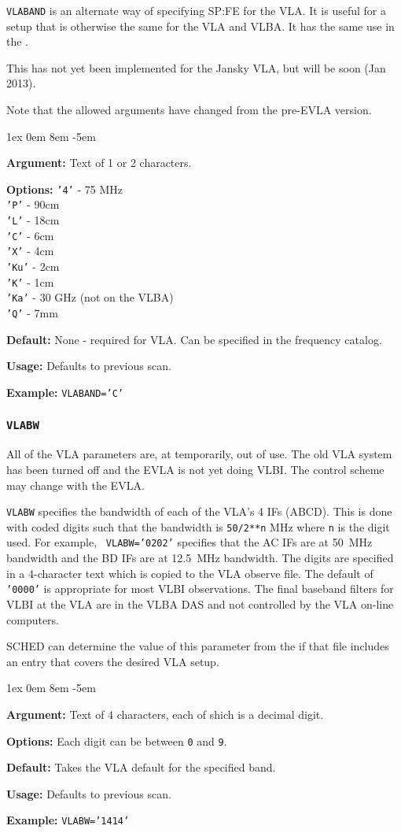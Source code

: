 \documentclass{report}
\newcommand{\rcwbox}[5]{
  \begin{list}{}{\parsep 1ex  \itemsep 0em
                 \leftmargin 8em  \itemindent -5em }
    \item {\bf Argument:} #1
    \item {\bf Options:}  #2
    \item {\bf Default:}  #3
    \item {\bf Usage:}    #4
    \item {\bf Example:}  #5
  \end{list}
}
\begin{document}
{\tt VLABAND} is an alternate way of specifying 
{SP:FE} for the VLA.  It is useful for a setup that is otherwise
the same for the VLA and VLBA.  It has the same use in the 
.

This has not yet been implemented for the Jansky VLA, but will be soon
(Jan 2013).

Note that the allowed arguments have changed from the pre-EVLA version.

\rcwbox
{Text of 1 or 2 characters.}
{{\tt '4'} - 75 MHz \\
 {\tt 'P'} - 90cm \\
 {\tt 'L'} - 18cm \\
 {\tt 'C'} - 6cm \\
 {\tt 'X'} - 4cm \\
 {\tt 'Ku'} - 2cm \\
 {\tt 'K'} - 1cm \\
 {\tt 'Ka'} - 30 GHz (not on the VLBA) \\
 {\tt 'Q'} - 7mm}
{None - required for VLA.  Can be specified in the frequency catalog.}
{Defaults to previous scan.}
{{\tt VLABAND='C'}}




\subsubsection{\label{SP:VLABW}{\tt VLABW}}

All of the VLA parameters are, at temporarily, out of use.  The old
VLA system has been turned off and the EVLA is not yet doing VLBI.
The control scheme may change with the EVLA.

{\tt VLABW} specifies the bandwidth of each of the VLA's 4
IFs (ABCD). This is done with coded digits such that the bandwidth is
{\tt 50/2**n} MHz where {\tt n} is the digit used. For example, {\tt
VLABW='0202'} specifies that the AC IFs are at 50~MHz bandwidth and
the BD IFs are at 12.5~MHz bandwidth. The digits are specified in a
4-character text which is copied to the VLA observe file. The default
of {\tt '0000'} is appropriate for most VLBI observations. The final
baseband filters for VLBI at the VLA are in the VLBA DAS and not
controlled by the VLA on-line computers.

SCHED can determine the value of this parameter from the
 if that file includes
an entry that covers the desired VLA setup.

\rcwbox
{Text of 4 characters, each of shich is a decimal digit.}
{Each digit can be between {\tt 0} and {\tt 9}.}
{Takes the VLA default for the specified band.}
{Defaults to previous scan.}
{{\tt VLABW='1414'}}
\end{document}
